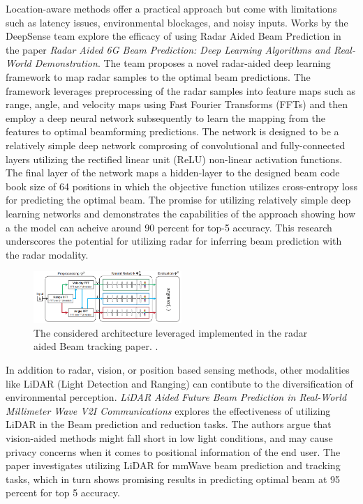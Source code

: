 Location-aware methods offer a practical approach but come with limitations such as latency issues, environmental blockages, and noisy inputs. Works by the DeepSense team explore the efficacy of using Radar Aided Beam Prediction in the paper \textit{Radar Aided 6G Beam Prediction: Deep Learning Algorithms and Real-World Demonstration}. The team proposes a novel radar-aided deep learning framework to map radar samples to the optimal beam predictions. The framework leverages preprocessing of the radar samples into feature maps such as range, angle, and velocity maps using Fast Fourier Transforms (FFTs) and then employ a deep neural network subsequently to learn the mapping from the features to optimal beamforming predictions. The network is designed to be a relatively simple deep network comprosing of convolutional and fully-connected layers utilizing the rectified linear unit (ReLU) non-linear activation functions. The final layer of the network maps a hidden-layer to the designed beam code book size of 64 positions in which the objective function utilizes cross-entropy loss for predicting the optimal beam. The promise for utilizing relatively simple deep learning networks and demonstrates the capabilities of the approach showing how a the model can acheive around 90 percent for top-5 accuracy. This research underscores the potential for utilizing radar for inferring beam prediction with the radar modality. \cite{demirhan2022radar} 

\begin{figure}[h!]
  \centering
  \includegraphics[width=0.5\textwidth]{Images/Literature_Review/demirhan2022radar_architecture.png}
  \caption{The considered architecture leveraged implemented in the radar aided Beam tracking paper. \cite{jiang2022computer}.}
  \label{fig:my_label}
\end{figure}

In addition to radar, vision, or position based sensing methods, other modalities like LiDAR (Light Detection and Ranging) can contibute to the diversification of environmental perception. \textit{LiDAR Aided Future Beam Prediction in Real-World Millimeter Wave V2I Communications} explores the effectiveness of utilizing LiDAR in the Beam prediction and reduction tasks. The authors argue that vision-aided methods might fall short in low light conditions, and may cause privacy concerns when it comes to positional information of the end user. The paper investigates utilizing LiDAR for mmWave beam prediction and tracking tasks, which in turn shows promising results in predicting optimal beam at 95 percent for top 5 accuracy.   


